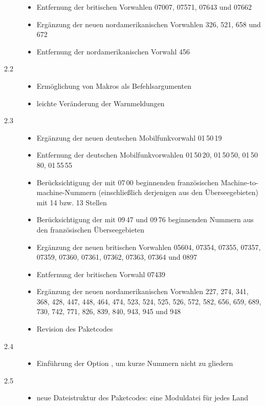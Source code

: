 \documentclass[numbers=noenddot]{scrreprt}
\begin{document}
\begin{description}
\begin{itemize}
\item Entfernung der britischen Vorwahlen 07007, 07571, 07643 und 07662
\item Ergänzung der neuen nordamerikanischen Vorwahlen 326, 521, 658 und 672
\item Entfernung der nordamerikanischen Vorwahl 456
\end{itemize}
\item[2.2] 
\begin{itemize}
\item Ermöglichung von Makros als Befehlsargumenten
\item leichte Veränderung der Warnmeldungen
\end{itemize}
\item[2.3] 
\begin{itemize}
\item Ergänzung der neuen deutschen Mobilfunkvorwahl 01\,50\,19
\item Entfernung der deutschen Mobilfunkvorwahlen 01\,50\,20, 01\,50\,50, 01\,50\,80, 01\,55\,55
\item Berücksichtigung der mit 07\,00 beginnenden französischen Machine-to-machine-Nummern (einschließlich derjenigen aus den Überseegebieten) mit 14 bzw. 13 Stellen
\item Berücksichtigung der mit 09\,47 und 09\,76 beginnenden Nummern aus den französischen Überseegebieten
\item Ergänzung der neuen britischen Vorwahlen 05604, 07354, 07355, 07357, 07359, 07360, 07361, 07362, 07363, 07364 und 0897
\item Entfernung der britischen Vorwahl 07439
\item Ergänzung der neuen nordamerikanischen Vorwahlen 227, 274, 341, 368, 428, 447, 448, 464, 474, 523, 524, 525, 526, 572, 582, 656, 659, 689, 730, 742, 771, 826, 839, 840, 943, 945 und 948
\item Revision des Paketcodes
\end{itemize}
\item[2.4] 
\begin{itemize}
\item Einführung der Option
, um kurze Nummern nicht zu gliedern
\end{itemize}
\item[2.5] 
\begin{itemize}
\item neue Dateistruktur des Paketcodes: eine Moduldatei für jedes Land

\end{itemize}
\end{description}
\end{document}
